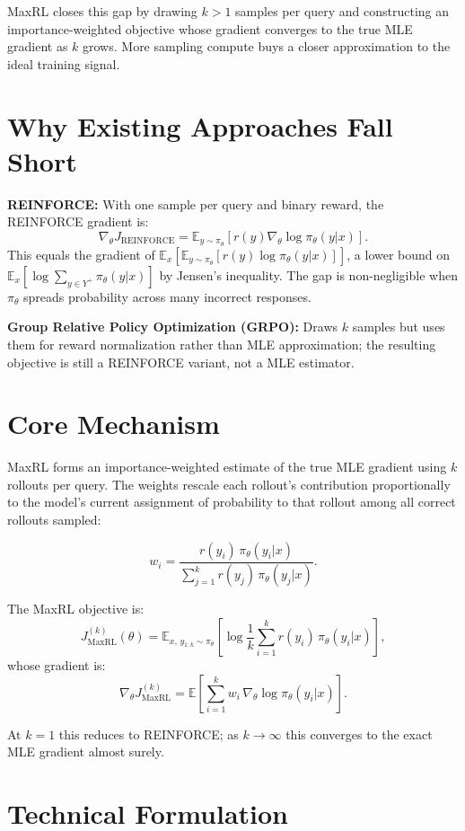 \documentclass[10pt,twocolumn]{article}
\begin{document}
MaxRL closes this gap by drawing $k > 1$ samples per query and constructing
an importance-weighted objective whose gradient converges to the true MLE
gradient as $k$ grows. More sampling compute buys a closer approximation
to the ideal training signal.

\section{Why Existing Approaches Fall Short}

\textbf{REINFORCE:} With one sample per query and binary reward,
the REINFORCE gradient is:
\[
\nabla_\theta J_\text{REINFORCE} =
  \mathbb{E}_{y \sim \pi_\theta}\!\left[r(y) \nabla_\theta \log \pi_\theta(y|x)\right].
\]
This equals the gradient of $\mathbb{E}_x[\mathbb{E}_{y \sim \pi_\theta}[r(y) \log
\pi_\theta(y|x)]]$, a lower bound on $\mathbb{E}_x[\log \sum_{y \in Y^+}
\pi_\theta(y|x)]$ by Jensen's inequality. The gap is non-negligible when
$\pi_\theta$ spreads probability across many incorrect responses.

\textbf{Group Relative Policy Optimization (GRPO):} Draws $k$ samples but
uses them for reward normalization rather than MLE approximation; the
resulting objective is still a REINFORCE variant, not a MLE estimator.

\section{Core Mechanism}

MaxRL forms an importance-weighted estimate of the true MLE gradient using
$k$ rollouts per query. The weights rescale each rollout's contribution
proportionally to the model's current assignment of probability to that rollout
among all correct rollouts sampled:

\[
w_i = \frac{r(y_i)\,\pi_\theta(y_i|x)}
           {\displaystyle\sum_{j=1}^k r(y_j)\,\pi_\theta(y_j|x)}.
\]

The MaxRL objective is:
\[
J_\text{MaxRL}^{(k)}(\theta) =
  \mathbb{E}_{x,\,y_{1:k} \sim \pi_\theta}
  \!\left[\log \frac{1}{k} \sum_{i=1}^k r(y_i)\,\pi_\theta(y_i|x)\right],
\]
whose gradient is:
\[
\nabla_\theta J_\text{MaxRL}^{(k)} =
  \mathbb{E}\!\left[\sum_{i=1}^k w_i \,\nabla_\theta \log \pi_\theta(y_i|x)\right].
\]

At $k=1$ this reduces to REINFORCE; as $k \to \infty$ this converges to
the exact MLE gradient almost surely.

\section{Technical Formulation}
\end{document}
